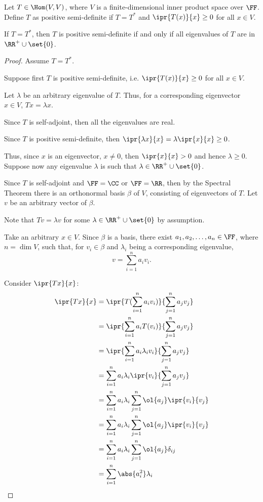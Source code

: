 \documentclass[11pt]{scrartcl}
\begin{document}
Let $T \in \Hom(V,V)$, where $V$ is a finite-dimensional inner product
space over $\FF$. Define $T$ as positive semi-definite if $T=T^{*}$ and
$\ipr{T(x)}{x}\geq 0$ for all $x\in V$.

\begin{lemma}
  \label{sec:1}
  If $T = T^{*}$, then $T$ is positive semi-definite if and only if
  all eigenvalues of $T$ are in $\RR^+\cup\set{0}$.
\end{lemma}

\begin{proof}
  \hfill

  Assume $T = T^{*}$.

  Suppose first $T$ is positive semi-definite, i.e. $\ipr{T(x)}{x}\geq0$ for all $x\in V$.

  Let $\lambda$ be an arbitrary eigenvalue of $T$. Thus, for a corresponding eigenvector $x\in V$, $Tx = \lambda x$.

  Since $T$ is self-adjoint, then all the eigenvalues are real.

  Since $T$ is positive semi-definite, then
  $\ipr{\lambda x}{x} = \lambda \ipr{x}{x} \geq 0$.

  Thus, since $x$ is an eigenvector, $x\neq 0$, then $\ipr{x}{x}>0$
  and hence $\lambda \geq 0$.
  Suppose now any eigenvalue $\lambda$ is such that $\lambda\in \RR^+\cup\set{0}$.

  Since $T$ is self-adjoint and $\FF=\CC$ or $\FF = \RR$, then by the
  Spectral Theorem there is an orthonormal basis $\beta$ of $V$,
  consisting of eigenvectors of $T$. Let $v$ be an arbitrary vector of $\beta$.

  Note that $Tv = \lambda v$ for some  $\lambda\in \RR^+\cup\set{0}$ by assumption.

  Take an arbitrary $x\in V$. Since $\beta$ is a basis, there exist
  $a_1, a_2,\dots,a_n\in \FF$, where $n=\dim V$, such that, for
  $v_i\in \beta$ and $\lambda_i$ being a corresponding eigenvalue,
  \[v  = \sum_{i=1}^na_iv_i.
  \]
  

  Consider $\ipr{Tx}{x}$:
\allowdisplaybreaks
  \begin{align}
    \ipr{Tx}{x} & = \ipr{T(\sum_{i=1}^na_iv_i)}{\sum_{j=1}^na_jv_j}       \\
                & = \ipr{\sum_{i=1}^na_iT(v_i)}{\sum_{j=1}^na_jv_j}       \\
                & = \ipr{\sum_{i=1}^na_i\lambda_iv_i}{\sum_{j=1}^na_jv_j} \\
                & = \sum_{i=1}^na_i\lambda_i\ipr{v_i}{\sum_{j=1}^na_jv_j} \\
                & = \sum_{i=1}^na_i\lambda_i\sum_{j=1}^n\ol{a_j}\ipr{v_i}{v_j} \\
                & = \sum_{i=1}^na_i\lambda_i\sum_{j=1}^n\ol{a_j}\ipr{v_i}{v_j} \\
                & = \sum_{i=1}^na_i\lambda_i\sum_{j=1}^n\ol{a_j}\delta_{ij} \\
    \label{eq:1}
                & = \sum_{i=1}^n\abs{a^2_i}\lambda_i 
  \end{align}


\end{proof}
\end{document}
